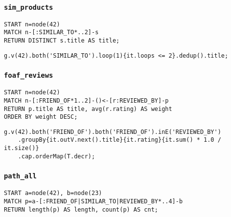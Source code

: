 \subsubsection*{\texttt{sim\_products}}

\begin{lstlisting}
START n=node(42) 
MATCH n-[:SIMILAR_TO*..2]-s 
RETURN DISTINCT s.title AS title;
\end{lstlisting}

\begin{lstlisting}
g.v(42).both('SIMILAR_TO').loop(1){it.loops <= 2}.dedup().title;
\end{lstlisting}

\subsubsection*{\texttt{foaf\_reviews}}

\begin{lstlisting}
START n=node(42)
MATCH n-[:FRIEND_OF*1..2]-()<-[r:REVIEWED_BY]-p
RETURN p.title AS title, avg(r.rating) AS weight
ORDER BY weight DESC;
\end{lstlisting}

\begin{lstlisting}
g.v(42).both('FRIEND_OF').both('FRIEND_OF').inE('REVIEWED_BY')
	.groupBy{it.outV.next().title}{it.rating}{it.sum() * 1.0 / it.size()}
	.cap.orderMap(T.decr);
\end{lstlisting}

\subsubsection*{\texttt{path\_all}}

\begin{lstlisting}
START a=node(42), b=node(23) 
MATCH p=a-[:FRIEND_OF|SIMILAR_TO|REVIEWED_BY*..4]-b 
RETURN length(p) AS length, count(p) AS cnt;
\end{lstlisting}

